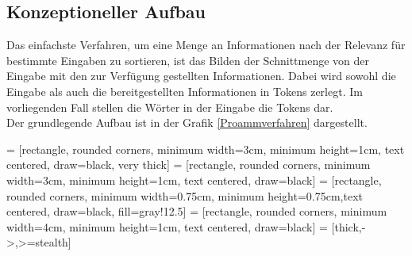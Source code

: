\documentclass[a4paper,10pt]{article}
\begin{document}
    \subsection{Konzeptioneller Aufbau}
        Das einfachste Verfahren, um eine Menge an Informationen nach der Relevanz für bestimmte Eingaben zu sortieren, ist das Bilden der Schnittmenge von der Eingabe mit den zur Verfügung gestellten Informationen. Dabei wird sowohl die Eingabe als auch die bereitgestellten Informationen in Tokens zerlegt. Im vorliegenden Fall stellen die Wörter in der Eingabe die Tokens dar.\\
        Der grundlegende Aufbau ist in der Grafik \ref{Proammverfahren} dargestellt.

         = [rectangle, rounded corners, minimum width=3cm, minimum height=1cm, text centered, draw=black, very thick]%
         = [rectangle, rounded corners, minimum width=3cm, minimum height=1cm, text centered, draw=black]
         = [rectangle, rounded corners, minimum width=0.75cm, minimum height=0.75cm,text centered, draw=black, fill=gray!12.5]
         = [rectangle, rounded corners, minimum width=4cm, minimum height=1cm, text centered, draw=black]
         = [thick,->,>=stealth]
\end{document}
